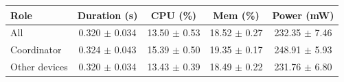 \begin{tabular}{lcccc}
\hline
\textbf{Role} & \textbf{Duration (s)} & \textbf{CPU (\%)} & \textbf{Mem (\%)} & \textbf{Power (mW)} \\
\hline
All & 0.320 $\pm$ 0.034 & 13.50 $\pm$ 0.53 & 18.52 $\pm$ 0.27 & 232.35 $\pm$ 7.46 \\
Coordinator & 0.324 $\pm$ 0.043 & 15.39 $\pm$ 0.50 & 19.35 $\pm$ 0.17 & 248.91 $\pm$ 5.93 \\
Other devices & 0.320 $\pm$ 0.034 & 13.43 $\pm$ 0.39 & 18.49 $\pm$ 0.22 & 231.76 $\pm$ 6.80 \\
\hline
\end{tabular}
